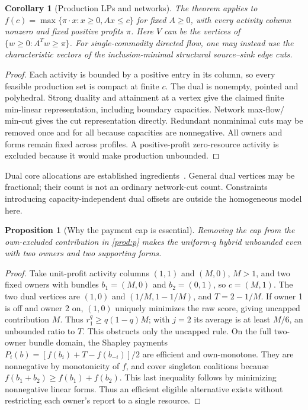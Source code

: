\documentclass[11pt]{article}
\newtheorem{proposition}[theorem]{Proposition}
\newtheorem{corollary}[theorem]{Corollary}
\theoremstyle{definition}\newtheorem{definition}[theorem]{Definition}
\theoremstyle{remark}\newtheorem{remark}[theorem]{Remark}
\begin{document}
\begin{corollary}[Production LPs and networks]\label{prod:lp}
The theorem applies to
$f(c)=\max\{\pi\cdot x:x\ge0,Ax\le c\}$ for fixed $A\ge0$, with every
activity column nonzero and fixed positive profits $\pi$. Here $V$ can be
the vertices of $\{w\ge0:A^Tw\ge\pi\}$. For single-commodity directed flow,
one may instead use the characteristic vectors of the inclusion-minimal
structural source--sink edge cuts.
\end{corollary}
\begin{proof}
Each activity is bounded by a positive entry in its column, so every feasible
production set is compact at finite $c$. The dual is nonempty, pointed and
polyhedral. Strong duality and attainment at a vertex give the claimed finite
min-linear representation, including boundary capacities. Network max-flow/
min-cut gives the cut representation directly. Redundant nonminimal cuts may
be removed once and for all because capacities are nonnegative. All owners
and forms remain fixed across profiles. A positive-profit zero-resource
activity is excluded because it would make production unbounded.
\end{proof}
Dual core allocations are established ingredients~\citep{Owen,SametZemel}.
General dual vertices may be fractional; their count is not an ordinary
network-cut count. Constraints introducing capacity-independent dual offsets
are outside the homogeneous model here.

\begin{proposition}[Why the payment cap is essential]\label{prod:uncapped}
Removing the cap from the own-excluded contribution in
\eqref{prod:p} makes the uniform-$q$ hybrid unbounded even with two owners
and two supporting forms.
\end{proposition}
\begin{proof}
Take unit-profit activity columns $(1,1)$ and $(M,0)$, $M>1$, and two
fixed owners with bundles $b_1=(M,0)$ and $b_2=(0,1)$, so $c=(M,1)$. The two dual vertices are $(1,0)$ and $(1/M,1-1/M)$, and
$T=2-1/M$. If owner 1 is off and owner 2 on, $(1,0)$ uniquely minimizes the
raw score, giving uncapped contribution $M$. Thus $r_1^q\ge q(1-q)M$;
with $j=2$ its average is at least $M/6$, an unbounded ratio to $T$.
This obstructs only the uncapped rule. On the full two-owner bundle
domain, the Shapley payments
$P_i(b)=[f(b_i)+T-f(b_{-i})]/2$ are efficient and own-monotone.
They are nonnegative by monotonicity of $f$, and cover singleton coalitions
because $f(b_1+b_2)\ge f(b_1)+f(b_2)$. This last inequality follows by
minimizing nonnegative linear forms. Thus an efficient eligible alternative
exists without restricting each owner's report to a single resource.
\end{proof}
\end{document}
